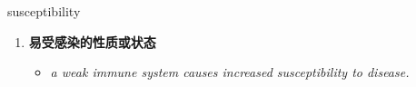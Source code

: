
\begin{frame}
{\huge susceptibility}
\begin{center}
\begin{enumerate}\Large
  \item \textbf{易受感染的性质或状态}
  \begin{itemize}
    \item \em{\Large{a weak immune system causes increased susceptibility to disease.}}
  \end{itemize}
\end{enumerate}
\end{center}
\end{frame}
